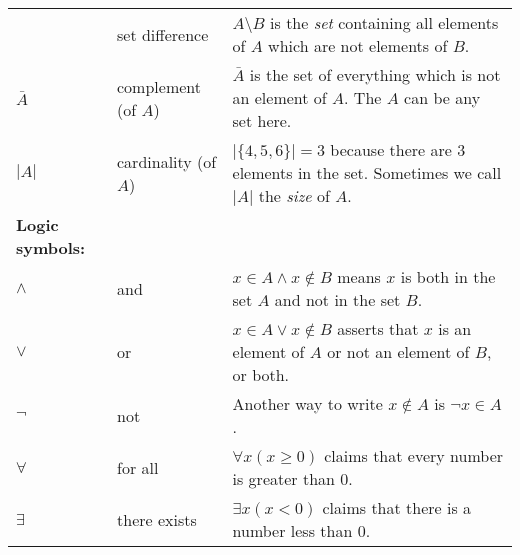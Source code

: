 \documentclass[10pt,]{book}
\newcommand{\terminology}[1]{\textbf{#1}}
\theoremstyle{plain}
\theoremstyle{definition}
\theoremstyle{definition}
\theoremstyle{definition}
\newcommand{\lt}{ < }
\begin{document}
\begin{mdframed}[style=assemblage]
\begin{tabular}{lll}
            &set difference&\(A \setminus B\) is the \emph{set} containing all elements of \(A\) which are not elements of \(B\).\tabularnewline[0pt]

              \(\bar{A}\)
            &complement (of \(A\))&\(\bar{A}\) is the set of everything which is not an element of \(A\). The \(A\) can be any set here.\tabularnewline[0pt]

              \(\left|A\right|\)
            &cardinality (of \(A\))&\(|\{4,5,6\}| = 3\) because there are 3 elements in the set. Sometimes we call \(|A|\) the \emph{size} of \(A\).\tabularnewline[0pt]
 \terminology{Logic symbols:}&\tabularnewline[0pt]
\(\wedge\)
            &and&\(x \in A \wedge x \notin B\) means \(x\) is both in the set \(A\) and not in the set \(B\).\tabularnewline[0pt]

              \(\vee\)

            &or&\(x \in A \vee x \notin B\) asserts that \(x\) is an element of \(A\) or not an element of \(B\), or both.\tabularnewline[0pt]

              \(\neg\)

            &not&Another way to write \(x \notin A\) is \(\neg x \in A\).\tabularnewline[0pt]

              \(\forall\)

            &for all&\(\forall x (x \ge 0)\) claims that every number is greater than 0.

            \tabularnewline[0pt]

              \(\exists\)

            &there exists
            &\(\exists x (x \lt  0)\) claims that there is a number less than 0.
\end{tabular}

\end{mdframed}
\end{document}
